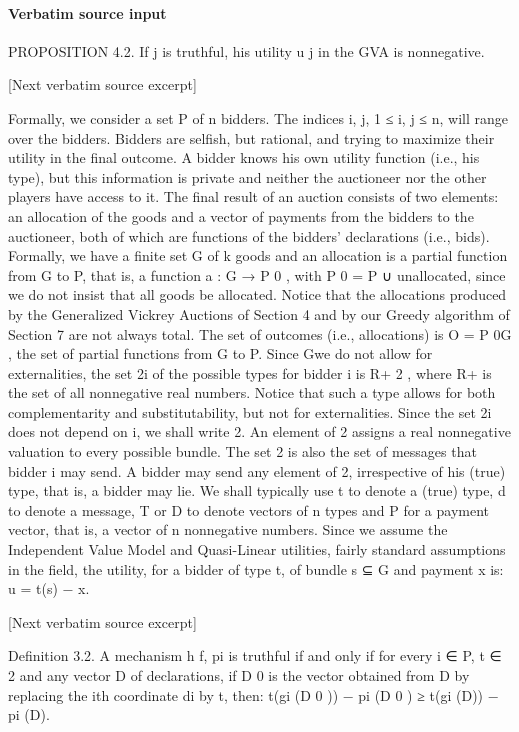 \documentclass[10pt]{article}
\begin{document}
\paragraph{Verbatim source input}
\begin{ReviewVerbatim}
PROPOSITION 4.2. If j is truthful, his utility u j in the GVA is nonnegative.

[Next verbatim source excerpt]

Formally, we consider a set P of n bidders. The indices i, j, 1 ≤ i, j ≤ n, will
range over the bidders. Bidders are selfish, but rational, and trying to maximize their
utility in the final outcome. A bidder knows his own utility function (i.e., his type),
but this information is private and neither the auctioneer nor the other players have
access to it. The final result of an auction consists of two elements: an allocation
of the goods and a vector of payments from the bidders to the auctioneer, both of
which are functions of the bidders’ declarations (i.e., bids). Formally, we have a
finite set G of k goods and an allocation is a partial function from G to P, that is, a
function a : G → P 0 , with P 0 = P ∪ {unallocated}, since we do not insist that all
goods be allocated. Notice that the allocations produced by the Generalized Vickrey
Auctions of Section 4 and by our Greedy algorithm of Section 7 are not always
total. The set of outcomes (i.e., allocations) is O = P 0G , the set of partial functions
from G to P. Since Gwe do not allow for externalities, the set 2i of the possible types
for bidder i is R+ 2 , where R+ is the set of all nonnegative real numbers. Notice
that such a type allows for both complementarity and substitutability, but not for
externalities. Since the set 2i does not depend on i, we shall write 2. An element
of 2 assigns a real nonnegative valuation to every possible bundle. The set 2 is
also the set of messages that bidder i may send. A bidder may send any element of
2, irrespective of his (true) type, that is, a bidder may lie. We shall typically use t
to denote a (true) type, d to denote a message, T or D to denote vectors of n types
and P for a payment vector, that is, a vector of n nonnegative numbers.
Since we assume the Independent Value Model and Quasi-Linear utilities, fairly
standard assumptions in the field, the utility, for a bidder of type t, of bundle s ⊆ G
and payment x is:
u = t(s) − x.

[Next verbatim source excerpt]

Definition 3.2. A mechanism h f, pi is truthful if and only if for every i ∈ P,
t ∈ 2 and any vector D of declarations, if D 0 is the vector obtained from D by
replacing the ith coordinate di by t, then: t(gi (D 0 )) − pi (D 0 ) ≥ t(gi (D)) − pi (D).


\end{ReviewVerbatim}
\end{document}
